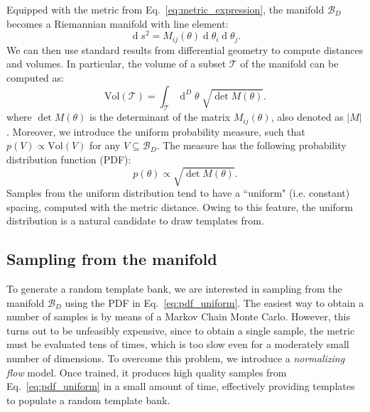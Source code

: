 \documentclass[twocolumn,showpacs,preprintnumbers,nofootinbib,prd,
superscriptaddress,10pt]{revtex4-2}
\renewcommand{\d}[1]{\ensuremath{\operatorname{d}\!{#1}}}
\newcommand{\dvol}[2]{\ensuremath{\operatorname{d}^{#2}\!{#1}}}
\begin{document}
Equipped with the metric from Eq.~\eqref{eq:metric_expression}, the manifold $\mathcal{B}_D$ becomes a Riemannian manifold with line element:
\begin{equation}\label{eq:line_element}
	\d{s^2} = M_{ij}(\theta) \d{\theta_i} \d{\theta_j}.
\end{equation}
We can then use standard results from differential geometry to compute distances and volumes. In particular, the volume of a subset $\mathcal{T}$ of the manifold can be computed as:
\begin{equation}\label{eq:volume_tile}
	\text{Vol}(\mathcal{T}) = \int_\mathcal{T} \dvol{\theta}{D} \; \sqrt{\det M(\theta)}.
\end{equation}
where $\det M(\theta)$ is the determinant of the matrix $M_{ij}(\theta)$, also denoted as $|M|$.
%
Moreover, we introduce the uniform probability measure, such that $p(V) \propto \text{Vol}(V)$ for any $V\subseteq \mathcal{B}_D$. The measure has the following probability distribution function (PDF):
\begin{equation}\label{eq:pdf_uniform}
	p(\theta) \propto \sqrt{\det M(\theta)}.
\end{equation}
Samples from the uniform distribution tend to have a ``uniform" (i.e. constant) spacing, computed with the metric distance. Owing to this feature, the uniform distribution is a natural candidate to draw templates from.

\subsection{Sampling from the manifold} \label{sec:normalizing_flow}

To generate a random template bank, we are interested in sampling from the manifold $\mathcal{B}_D$ using the PDF in Eq.~\eqref{eq:pdf_uniform}.
The easiest way to obtain a number of samples is by means of a Markov Chain Monte Carlo. However, this turns out to be unfeasibly expensive, since to obtain a single sample, the metric must be evaluated tens of times, which is too slow even for a moderately small number of dimensions.
To overcome this problem, we introduce a {\it normalizing flow} model. Once trained, it produces high quality samples from Eq.~\eqref{eq:pdf_uniform} in a small amount of time, effectively providing templates to populate a random template bank.
\end{document}
